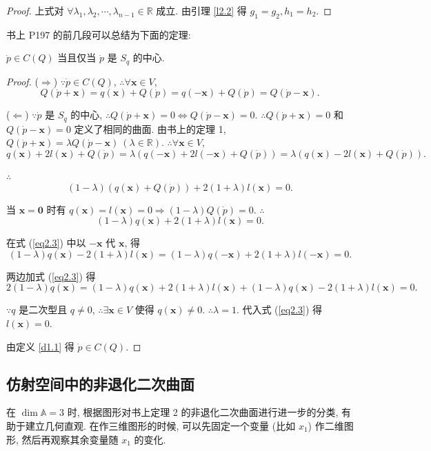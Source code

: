 \documentclass[color=black,device=normal,lang=cn,mode=geye]{elegantnote}
\begin{document}
\begin{proof}
    上式对 $\forall\lambda_1,\lambda_2,\cdots,\lambda_{n-1}\in\mathbb{R}$ 成立. 由引理 \ref{l2.2} 得 $g_1=g_2,h_1=h_2$.
\end{proof}
书上 P197 的前几段可以总结为下面的定理:
\begin{theorem}
    $\dot{p}\in C(Q)$ 当且仅当 $\dot{p}$ 是 $S_q$ 的中心. 
\end{theorem}
\begin{proof}
    ($\Rightarrow$) $\because\dot{p}\in C(Q)$, $\therefore\forall\boldsymbol{x}\in V$,
    \[Q(\dot{p}+\boldsymbol{x})=q(\boldsymbol{x})+Q(\dot{p})=q(-\boldsymbol{x})+Q(\dot{p})=Q(\dot{p}-\boldsymbol{x}).\]

    ($\Leftarrow$) $\because\dot{p}$ 是 $S_q$ 的中心, $\therefore Q(\dot{p}+\boldsymbol{x})=0\Leftrightarrow Q(\dot{p}-\boldsymbol{x})=0$. $\therefore Q(\dot{p}+\boldsymbol{x})=0$ 和 $Q(\dot{p}-\boldsymbol{x})=0$ 定义了相同的曲面. 由书上的定理 1, $Q(\dot{p}+\boldsymbol{x})=\lambda Q(\dot{p}-\boldsymbol{x})\ (\lambda\in\mathbb{R})$. $\therefore\forall\boldsymbol{x}\in V$,
    \[q(\boldsymbol{x})+2l(\boldsymbol{x})+Q(\dot{p})=\lambda(q(\boldsymbol{-x})+2l(\boldsymbol{-x})+Q(\dot{p}))=\lambda(q(\boldsymbol{x})-2l(\boldsymbol{x})+Q(\dot{p})).\]

    $\therefore$
    \[(1-\lambda)(q(\boldsymbol{x})+Q(\dot{p}))+2(1+\lambda)l(\boldsymbol{x})=0.\]

    当 $\boldsymbol{x}=\boldsymbol{0}$ 时有 $q(\boldsymbol{x})=l(\boldsymbol{x})=0\Rightarrow(1-\lambda)Q(\dot{p})=0$. $\therefore$
    \begin{equation}\label{eq2.3}
        (1-\lambda)q(\boldsymbol{x})+2(1+\lambda)l(\boldsymbol{x})=0.
    \end{equation}

    在式 (\ref{eq2.3}) 中以 $-\boldsymbol{x}$ 代 $\boldsymbol{x}$, 得
    \[(1-\lambda)q(\boldsymbol{x})-2(1+\lambda)l(\boldsymbol{x})=(1-\lambda)q(-\boldsymbol{x})+2(1+\lambda)l(-\boldsymbol{x})=0.\]

    两边加式 (\ref{eq2.3}) 得
    \[2(1-\lambda)q(\boldsymbol{x})=(1-\lambda)q(\boldsymbol{x})+2(1+\lambda)l(\boldsymbol{x})+(1-\lambda)q(\boldsymbol{x})-2(1+\lambda)l(\boldsymbol{x})=0.\]

    $\because q$ 是二次型且 $q\neq0$, $\therefore\exists\boldsymbol{x}\in V$ 使得 $q(\boldsymbol{x})\neq0$. $\therefore\lambda=1$. 代入式 (\ref{eq2.3}) 得 $l(\boldsymbol{x})=0$.

    由定义 \ref{d1.1} 得 $\dot{p}\in C(Q)$.
\end{proof}
\subsection{仿射空间中的非退化二次曲面}
在 $\dim\mathbb{A}=3$ 时, 根据图形对书上定理 2 的非退化二次曲面进行进一步的分类, 有助于建立几何直观. 在作三维图形的时候, 可以先固定一个变量 (比如 $x_1$) 作二维图形, 然后再观察其余变量随 $x_1$ 的变化.
\end{document}
